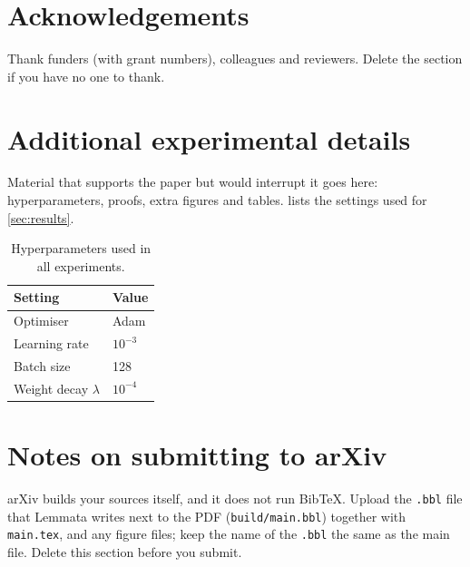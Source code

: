 \documentclass[11pt,a4paper]{article}
\begin{document}
\section*{Acknowledgements}
Thank funders (with grant numbers), colleagues and reviewers. Delete the section if you have no one to thank.



\appendix
\section{Additional experimental details}\label{app:details}
Material that supports the paper but would interrupt it goes here: hyperparameters, proofs,
extra figures and tables.  lists the settings used for \cref{sec:results}.

\begin{table}[ht]
  \centering
  \caption{Hyperparameters used in all experiments.}
  \label{tab:hyper}
  \begin{tabular}{ll}
    \toprule
    Setting & Value \\
    \midrule
    Optimiser & Adam \citep{kingma2015} \\
    Learning rate & $10^{-3}$ \\
    Batch size & 128 \\
    Weight decay $\lambda$ & $10^{-4}$ \\
    \bottomrule
  \end{tabular}
\end{table}

\section{Notes on submitting to arXiv}
arXiv builds your sources itself, and it does not run BibTeX. Upload the \texttt{.bbl} file that
Lemmata writes next to the PDF (\texttt{build/main.bbl}) together with \texttt{main.tex}, and any figure
files; keep the name of the \texttt{.bbl} the same as the main file. Delete this section before you submit.
\end{document}
